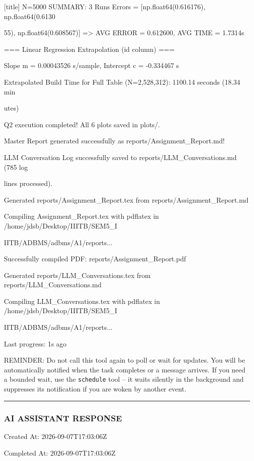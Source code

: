 \documentclass[11pt,a4paper]{article}
\begin{document}
[title] N=5000 SUMMARY: 3 Runs Errors = [np.float64(0.616176), np.float64(0.6130

55), np.float64(0.608567)] => AVG ERROR = 0.612600, AVG TIME = 1.7314s

=== Linear Regression Extrapolation (id column) ===

Slope m = 0.00043526 s/sample, Intercept c = -0.334467 s

Extrapolated Build Time for Full Table (N=2,528,312): 1100.14 seconds (18.34 min

utes)

Q2 execution completed! All 6 plots saved in plots/.

Master Report generated successfully as reports/Assignment\_Report.md!

LLM Conversation Log successfully saved to reports/LLM\_Conversations.md (785 log

lines processed).

Generated reports/Assignment\_Report.tex from reports/Assignment\_Report.md

Compiling Assignment\_Report.tex with pdflatex in /home/jdsb/Desktop/IIITB/SEM5\_I

IITB/ADBMS/adbms/A1/reports...

Successfully compiled PDF: reports/Assignment\_Report.pdf

Generated reports/LLM\_Conversations.tex from reports/LLM\_Conversations.md

Compiling LLM\_Conversations.tex with pdflatex in /home/jdsb/Desktop/IIITB/SEM5\_I

IITB/ADBMS/adbms/A1/reports...


Last progress: 1s ago



REMINDER: Do not call this tool again to poll or wait for updates. You will be automatically notified when the task completes or a message arrives. If you need a bounded wait, use the \texttt{schedule} tool -- it waits silently in the background and suppresses its notification if you are woken by another event.


\hrule

\subsubsection{AI ASSISTANT RESPONSE}

Created At: 2026-09-07T17:03:06Z

Completed At: 2026-09-07T17:03:06Z
\end{document}
